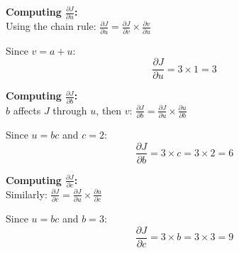 \documentclass[11pt,a4paper]{article}
\theoremstyle{definition}
\theoremstyle{remark}
\begin{document}
\vspace{0.4cm}

\begin{gradcomp}
\textbf{Computing $\frac{\partial J}{\partial u}$:} \\
Using the chain rule: $\frac{\partial J}{\partial u} = \frac{\partial J}{\partial v} \times \frac{\partial v}{\partial u}$

Since $v = a + u$:
\[
\frac{\partial J}{\partial u} = 3 \times 1 = 3
\]

\textbf{Computing $\frac{\partial J}{\partial b}$:} \\
$b$ affects $J$ through $u$, then $v$: $\frac{\partial J}{\partial b} = \frac{\partial J}{\partial u} \times \frac{\partial u}{\partial b}$

Since $u = bc$ and $c = 2$:
\[
\frac{\partial J}{\partial b} = 3 \times c = 3 \times 2 = 6
\]

\textbf{Computing $\frac{\partial J}{\partial c}$:} \\
Similarly: $\frac{\partial J}{\partial c} = \frac{\partial J}{\partial u} \times \frac{\partial u}{\partial c}$

Since $u = bc$ and $b = 3$:
\[
\frac{\partial J}{\partial c} = 3 \times b = 3 \times 3 = 9
\]
\end{gradcomp}

\vspace{0.4cm}
\end{document}
